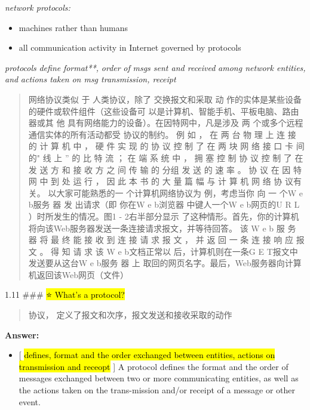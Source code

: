 \documentclass[
]{article}
\begin{document}
\emph{network protocols:}

\begin{itemize}
\item
  machines rather than humans
\item
  all communication activity in Internet governed by protocols
\end{itemize}

\emph{protocols} \emph{define} \emph{format**,} \emph{order} \emph{of}
\emph{msgs sent and received} \emph{among network entities, and}
\emph{actions taken} \emph{on msg transmission, receipt}

\begin{quote}
网络协议类似 于 人类协议，除了 交换报文和采取 动
作的实体是某些设备的硬件或软件组件（这些设备可
以是计算机、智能手机、平板电脑、路由器或其 他
具有网络能力的设备）。在因特网中，凡是涉及 两
个或多个远程通信实体的所有活动都受 协议的制约。 例 如 ， 在 两 台 物 理
上 连 接 的 计 算 机 中 ， 硬 件 实 现 的 协 议 控 制 了 在 两 块 网 络
接 口 卡 间 的" 线 上 '' 的 比 特 流 ； 在 端 系 统 中 ， 拥 塞 控 制 协
议 控 制 了 在 发 送 方 和 接 收 方 之 间 传 输 的 分组 发 送 的 速 率
。 协 议 在 因 特 网 中 到 处 运 行 ， 因 此 本 书 的 大 量 篇 幅 与 计
算 机 网 络 协 议有关。 以大家可能熟悉的一 个计算机网络协议为
例，考虑当你 向 一 个W e b服务 器 发 出请求（即 你在W e b浏览器
中键人一个W e b网页的U R L ）时所发生的情况。图1 - 2右半部分显示
了这种情形。首先，你的计算机将向该Web服务器发送一条连接请求报文，并等待回答。
该 W e b 服 务 器 将 最 终 能 接 收 到 连 接 请 求 报 文 ， 并 返 回 一
条 连 接 响 应 报 文 。 得 知 请 求 该 W e b文档正常以
后，计算机则在一条G E T报文中 发送要从这台W e b服务 器 上
取回的网页名字。最后，Web服务器向计算机返回该Web网页（文件）
\end{quote}

1.11 \#\#\# \hl{⭐️ What's a protocol?}

\begin{quote}
协议， 定义了报文和次序，报文发送和接收采取的动作
\end{quote}

\textbf{Answer:}

\begin{itemize}
\item
  {[} \hl{defines, format and the order exchanged between entities,
  actions on transmission and receopt} {]} A protocol defines the format
  and the order of messages exchanged between two or more communicating
  entities, as well as the actions taken on the trans-mission and/or
  receipt of a message or other event.
\end{itemize}
\end{document}
